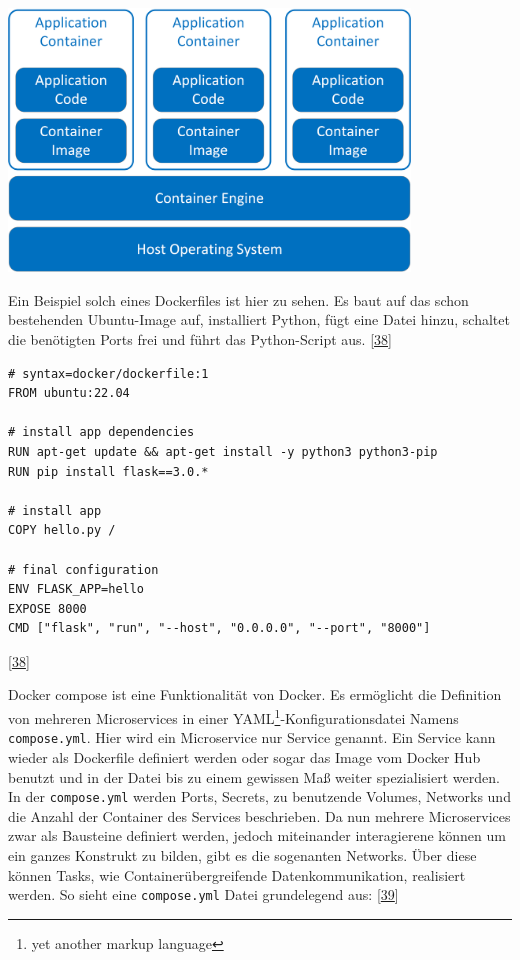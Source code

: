 \documentclass[
    headings=optiontotocandhead,%
    twoside,
    numbers=noenddot,%
    12pt, %
    titlepage, %
    parskip=full, %
    listof=leveldown, 
    numbers=noenddot, %
    a4paper,DIV=14,
    BCOR=15mm,
]{scrbook}
\newcommand{\passthrough}[1]{#1}
\let\origfigure=\figure
\let\endorigfigure=\endfigure
\renewenvironment{figure}[1][]{%
   \origfigure[H]
}{%
   \endorigfigure
}
\begin{document}
\begin{figure}
\centering
\includegraphics[width=0.8\textwidth,height=\textheight]{img/Schrempf/container-infrastructure-overview.png}
\caption{Übersicht vom Containeraufbau
{[}\protect\hyperlink{ref-container-overview}{37}{]}}
\end{figure}

Ein Beispiel solch eines Dockerfiles ist hier zu sehen. Es baut auf das
schon bestehenden Ubuntu-Image auf, installiert Python, fügt eine Datei
hinzu, schaltet die benötigten Ports frei und führt das Python-Script
aus. {[}\protect\hyperlink{ref-docker-dockerfile}{38}{]}

\begin{lstlisting}[caption={Beispiel eines Dockerfiles}]
# syntax=docker/dockerfile:1
FROM ubuntu:22.04

# install app dependencies
RUN apt-get update && apt-get install -y python3 python3-pip
RUN pip install flask==3.0.*

# install app
COPY hello.py /

# final configuration
ENV FLASK_APP=hello
EXPOSE 8000
CMD ["flask", "run", "--host", "0.0.0.0", "--port", "8000"]
\end{lstlisting}

{[}\protect\hyperlink{ref-docker-dockerfile}{38}{]}

Docker compose ist eine Funktionalität von Docker. Es ermöglicht die
Definition von mehreren Microservices in einer
YAML\footnote{yet another markup language}-Konfigurationsdatei Namens
\passthrough{\lstinline!compose.yml!}. Hier wird ein Microservice nur
Service genannt. Ein Service kann wieder als Dockerfile definiert werden
oder sogar das Image vom Docker Hub benutzt und in der Datei bis zu
einem gewissen Maß weiter spezialisiert werden. In der
\passthrough{\lstinline!compose.yml!} werden Ports, Secrets, zu
benutzende Volumes, Networks und die Anzahl der Container des Services
beschrieben. Da nun mehrere Microservices zwar als Bausteine definiert
werden, jedoch miteinander interagierene können um ein ganzes Konstrukt
zu bilden, gibt es die sogenanten Networks. Über diese können Tasks, wie
Containerübergreifende Datenkommunikation, realisiert werden. So sieht
eine \passthrough{\lstinline!compose.yml!} Datei grundelegend aus:
{[}\protect\hyperlink{ref-docker-compose}{39}{]}
\end{document}
